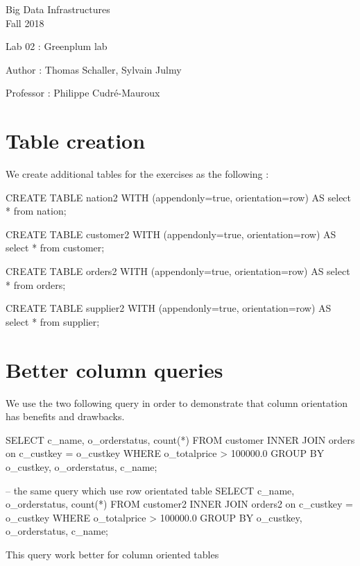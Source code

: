 \documentclass[a4paper,11pt]{report}
\date{\today}
\begin{document}
\begin{center}
\Large{
    Big Data Infrastructures\\
    Fall 2018
  }
  
  \noindent\makebox[\linewidth]{\rule{\linewidth}{0.4pt}}
  Lab 02 : Greenplum lab

  \vspace*{1.4cm}

  Author : Thomas Schaller, Sylvain Julmy
  \noindent\makebox[\linewidth]{\rule{\linewidth}{0.4pt}}

  \begin{flushleft}
    Professor : Philippe Cudré-Mauroux
  \end{flushleft}

  \noindent\makebox[\linewidth]{\rule{\textwidth}{1pt}}
\end{center}

\section*{Table creation}
We create additional tables for the exercises as the following :

\begin{sqlcode}
CREATE TABLE nation2 WITH (appendonly=true, orientation=row) AS select * from nation;

CREATE TABLE customer2 WITH (appendonly=true, orientation=row) AS select * from customer;

CREATE TABLE orders2 WITH (appendonly=true, orientation=row) AS select * from orders;

CREATE TABLE supplier2 WITH (appendonly=true, orientation=row) AS select * from supplier;
\end{sqlcode}

\newpage

\section*{Better column queries}

We use the two following query in order to demonstrate that column orientation
has benefits and drawbacks.

\begin{listing}[H]
\centering
\begin{sqlcode}
SELECT c_name, o_orderstatus, count(*) FROM customer
    INNER JOIN orders on c_custkey = o_custkey
    WHERE o_totalprice > 100000.0
    GROUP BY o_custkey, o_orderstatus, c_name;

-- the same query which use row orientated table
SELECT c_name, o_orderstatus, count(*) FROM customer2
    INNER JOIN orders2 on c_custkey = o_custkey
    WHERE o_totalprice > 100000.0
    GROUP BY o_custkey, o_orderstatus, c_name;
\end{sqlcode}
\caption{This query work better for column oriented tables}
\label{lst:best-col-query}
\end{listing}
\end{document}
